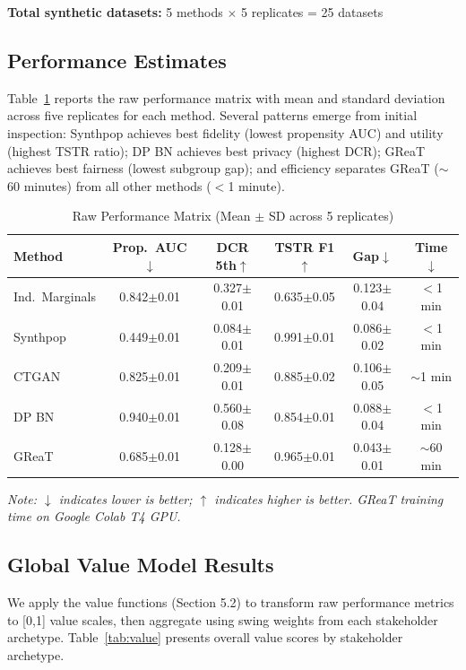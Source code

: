 \documentclass[12pt,a4paper]{article}
\begin{document}
\textbf{Total synthetic datasets:} 5 methods $\times$ 5 replicates = 25 datasets

\subsection{Performance Estimates}

Table~\ref{tab:performance} reports the raw performance matrix with mean and standard deviation across five replicates for each method. Several patterns emerge from initial inspection: Synthpop achieves best fidelity (lowest propensity AUC) and utility (highest TSTR ratio); DP BN achieves best privacy (highest DCR); GReaT achieves best fairness (lowest subgroup gap); and efficiency separates GReaT ($\sim$60 minutes) from all other methods ($<$1 minute).

\begin{table}[htbp]
\centering
\caption{Raw Performance Matrix (Mean $\pm$ SD across 5 replicates)}
\label{tab:performance}
\begin{tabular}{@{}lccccc@{}}
\toprule
\textbf{Method} & \textbf{Prop.\ AUC}$\downarrow$ & \textbf{DCR 5th}$\uparrow$ & \textbf{TSTR F1}$\uparrow$ & \textbf{Gap}$\downarrow$ & \textbf{Time}$\downarrow$ \\
\midrule
Ind.\ Marginals & 0.842$\pm$0.01 & 0.327$\pm$0.01 & 0.635$\pm$0.05 & 0.123$\pm$0.04 & $<$1 min \\
Synthpop & 0.449$\pm$0.01 & 0.084$\pm$0.01 & 0.991$\pm$0.01 & 0.086$\pm$0.02 & $<$1 min \\
CTGAN & 0.825$\pm$0.01 & 0.209$\pm$0.01 & 0.885$\pm$0.02 & 0.106$\pm$0.05 & $\sim$1 min \\
DP BN & 0.940$\pm$0.01 & 0.560$\pm$0.08 & 0.854$\pm$0.01 & 0.088$\pm$0.04 & $<$1 min \\
GReaT & 0.685$\pm$0.01 & 0.128$\pm$0.00 & 0.965$\pm$0.01 & 0.043$\pm$0.01 & $\sim$60 min \\
\bottomrule
\end{tabular}
\end{table}

\textit{Note: $\downarrow$ indicates lower is better; $\uparrow$ indicates higher is better. GReaT training time on Google Colab T4 GPU.}

\subsection{Global Value Model Results}

We apply the value functions (Section 5.2) to transform raw performance metrics to [0,1] value scales, then aggregate using swing weights from each stakeholder archetype. Table~\ref{tab:value} presents overall value scores by stakeholder archetype.
\end{document}
